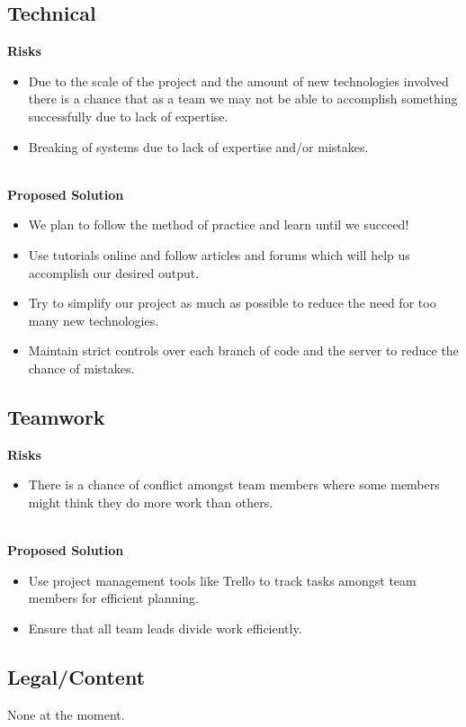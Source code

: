 \subsection{Technical}
\textbf{Risks}
\begin{itemize}
\item Due to the scale of the project and the amount of new technologies involved there is a chance that as a team we may not be able to accomplish something successfully due to lack of expertise.
\item Breaking of systems due to lack of expertise and/or mistakes.
\end{itemize}\hfill\\
\textbf{Proposed Solution}
\begin{itemize}
\item We plan to follow the method of practice and learn until we succeed!
\item Use tutorials online and follow articles and forums which will help us accomplish our desired output.
\item Try to simplify our project as much as possible to reduce the need for too many new technologies.
\item Maintain strict controls over each branch of code and the server to reduce the chance of mistakes.
\end{itemize}

\subsection{Teamwork}
\textbf{Risks}
\begin{itemize}
\item There is a chance of conflict amongst team members where some members might think they do more work than others.
\end{itemize}\hfill\\
\textbf{Proposed Solution}
\begin{itemize}
\item Use project management tools like Trello to track tasks amongst team members for efficient planning.
\item Ensure that all team leads divide work efficiently.
\end{itemize}

\subsection{Legal/Content}
None at the moment.